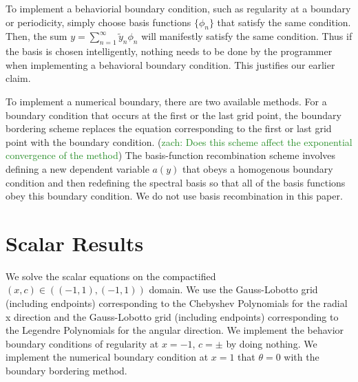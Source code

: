 \documentclass[aps,prd,amsmath,showpacs,amssymb,superscriptaddress,nofootinbib,longbibliography,eqsecnum,preprintnumbers]{revtex4-1}
\newcommand{\zach}[1]{\textcolor{ForestGreen}{#1}}
\begin{document}
To implement a behaviorial boundary condition, such as regularity at a boundary or periodicity, simply choose basis functions $\{\phi_n\}$ that satisfy the same condition. 
Then, 
the sum $y=\sum_{n=1}^\infty \tilde y_n \phi_n$ will manifestly satisfy the same condition. Thus if the basis is chosen intelligently, nothing needs to be done by the programmer when implementing a behavioral boundary condition. This justifies our earlier claim.

To implement a numerical boundary, there are two available methods. For a boundary condition that occurs at the first or the last grid point, the boundary bordering scheme replaces the equation corresponding to the first or last grid point with the boundary condition. (\zach{zach: Does this scheme affect the exponential convergence of the method}) The basis-function recombination scheme involves defining a new dependent variable $a(y)$ that obeys a homogenous boundary condition and then redefining the spectral basis so that all of the basis functions obey this boundary condition. We do not use basis recombination in this paper.



\section{Scalar Results}
We solve the scalar equations on the compactified $(x,c)\in((-1,1),(-1,1))$ domain.
We use the Gauss-Lobotto grid (including endpoints) corresponding to the Chebyshev Polynomials for the radial x direction and the Gauss-Lobotto grid (including endpoints) corresponding to the Legendre Polynomials for the angular direction. We implement the behavior boundary conditions of regularity at $x=-1$, $c=\pm$ by doing nothing. We implement the numerical boundary condition at $x=1$ that $\theta =0$ with the boundary bordering method.

\end{document}
